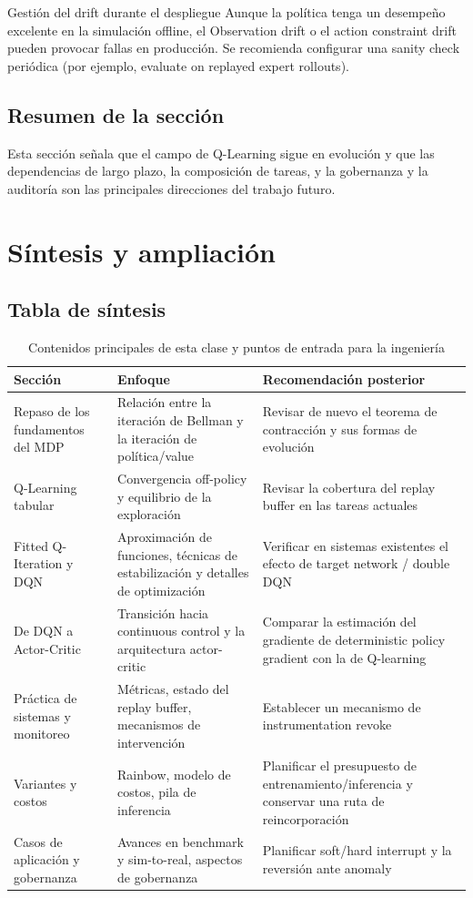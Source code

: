 \documentclass[a4paper]{article}
\begin{document}
\begin{warningbox}{Gestión del drift durante el despliegue}
Aunque la política tenga un desempeño excelente en la simulación offline, el Observation drift o el action constraint drift pueden provocar fallas en producción. Se recomienda configurar una sanity check periódica (por ejemplo, evaluate on replayed expert rollouts).
\end{warningbox}

\subsection{Resumen de la sección}

Esta sección señala que el campo de Q-Learning sigue en evolución y que las dependencias de largo plazo, la composición de tareas, y la gobernanza y la auditoría son las principales direcciones del trabajo futuro.
\section{Síntesis y ampliación}

\subsection{Tabla de síntesis}

\begin{table}[H]
\centering
\begin{tabular}{lp{8cm}p{4cm}}
\toprule
Sección & Enfoque & Recomendación posterior \\
\midrule
Repaso de los fundamentos del MDP & Relación entre la iteración de Bellman y la iteración de política/value & Revisar de nuevo el teorema de contracción y sus formas de evolución \\
Q-Learning tabular & Convergencia off-policy y equilibrio de la exploración & Revisar la cobertura del replay buffer en las tareas actuales \\
Fitted Q-Iteration y DQN & Aproximación de funciones, técnicas de estabilización y detalles de optimización & Verificar en sistemas existentes el efecto de target network / double DQN \\
De DQN a Actor-Critic & Transición hacia continuous control y la arquitectura actor-critic & Comparar la estimación del gradiente de deterministic policy gradient con la de Q-learning \\
Práctica de sistemas y monitoreo & Métricas, estado del replay buffer, mecanismos de intervención & Establecer un mecanismo de instrumentation revoke \\
Variantes y costos & Rainbow, modelo de costos, pila de inferencia & Planificar el presupuesto de entrenamiento/inferencia y conservar una ruta de reincorporación \\
Casos de aplicación y gobernanza & Avances en benchmark y sim-to-real, aspectos de gobernanza & Planificar soft/hard interrupt y la reversión ante anomaly \\
\bottomrule
\end{tabular}
\caption{Contenidos principales de esta clase y puntos de entrada para la ingeniería}
\end{table}
\end{document}

